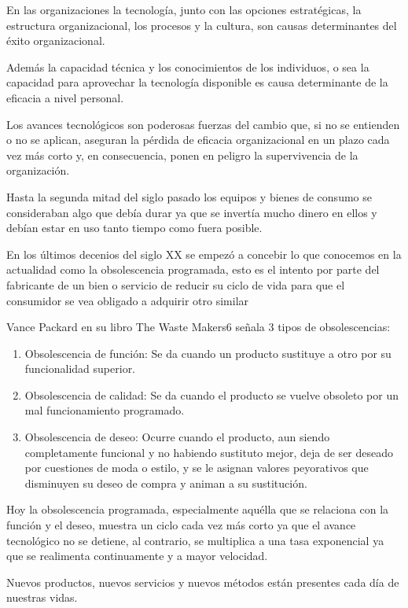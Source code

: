 \documentclass[a4paper, 12pt]{article}
\begin{document}
En las organizaciones la tecnología, junto con las opciones estratégicas, la estructura organizacional, los procesos y la cultura, son causas determinantes del éxito organizacional. 

Además la capacidad técnica y los conocimientos de los individuos, o sea la capacidad para aprovechar la tecnología disponible es causa determinante de la eficacia a nivel personal.

Los avances tecnológicos son poderosas fuerzas del cambio que, si no se entienden o no se aplican, aseguran la pérdida de eficacia organizacional en un plazo cada vez más corto y, en consecuencia, ponen en peligro la supervivencia de la organización.

Hasta la segunda mitad del siglo pasado los equipos y bienes de consumo se consideraban algo que debía durar ya que se invertía mucho dinero en ellos y debían estar en uso tanto tiempo como fuera posible.

En los últimos decenios del siglo XX se empezó a concebir lo que conocemos en la actualidad como la obsolescencia programada, esto es el intento por parte del fabricante de un bien o servicio de reducir su ciclo de vida para que el consumidor se vea obligado a adquirir otro similar

Vance Packard{\cite{Packard1964}} en su libro The Waste Makers6 señala 3 tipos de obsolescencias:

\begin{enumerate}
\item Obsolescencia de función: Se da cuando un producto sustituye a otro por su funcionalidad superior.
\item Obsolescencia de calidad: Se da cuando el producto se vuelve obsoleto por un mal funcionamiento programado.
\item Obsolescencia de deseo: Ocurre cuando el producto, aun siendo completamente funcional y no habiendo sustituto mejor, deja de ser deseado por cuestiones de moda o estilo, y se le asignan valores peyorativos que disminuyen su deseo de compra y animan a su sustitución.
\end{enumerate}

Hoy la obsolescencia programada, especialmente aquélla que se relaciona con la función y el deseo, muestra un ciclo cada vez más corto ya que el avance tecnológico no se detiene, al contrario, se multiplica a una tasa exponencial ya que se realimenta continuamente y a mayor velocidad.

Nuevos productos, nuevos servicios y nuevos métodos están presentes cada día de nuestras vidas.
\end{document}
